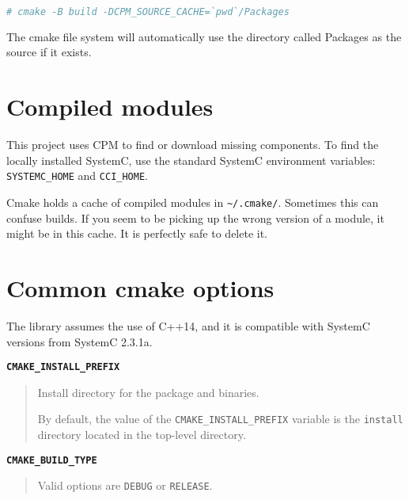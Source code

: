 \small
\begin{lstlisting}[language=bash]
    # cmake -B build -DCPM_SOURCE_CACHE=`pwd`/Packages
\end{lstlisting}
\normalsize

\note The cmake file system will automatically use the directory called Packages as the source if it exists.


\section{Compiled modules}

This project uses CPM {} to find or download missing components. To find the locally installed SystemC, use the standard SystemC environment variables: {\small{\lstinline!SYSTEMC_HOME!}} and {\small{\lstinline!CCI_HOME!}}.

Cmake holds a cache of compiled modules in {\small{\lstinline!~/.cmake/!}}. Sometimes this can confuse builds. If you seem to be picking up the wrong version of a module, it might be in this cache. It is perfectly safe to delete it.


\clearpage
\section{Common cmake options}

The library assumes the use of C++14, and it is compatible with SystemC versions from SystemC 2.3.1a.

{\textbf {\footnotesize{\lstinline!CMAKE_INSTALL_PREFIX!}}}
\begin{quote}
Install directory for the package and binaries.

By default, the value of the {\small{\lstinline!CMAKE_INSTALL_PREFIX!}} variable is the {\small{\lstinline!install!}} directory located in the top-level directory.
\end{quote}

{\textbf {\footnotesize{\lstinline!CMAKE_BUILD_TYPE!}}}
\begin{quote}
Valid options are {\small{\lstinline!DEBUG!}} or {\small{\lstinline!RELEASE!}}.
\end{quote}



